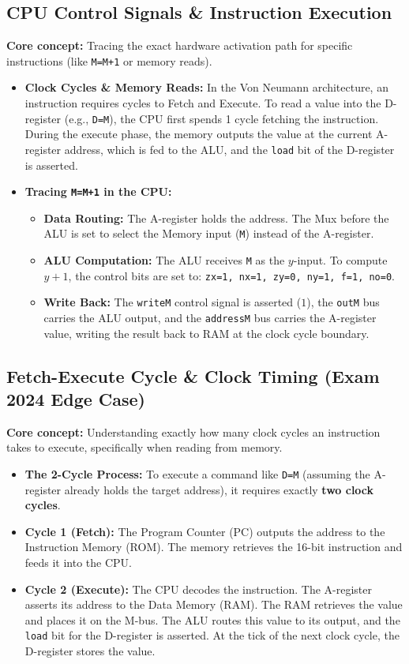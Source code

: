 \documentclass[12pt,a4paper]{article}
\begin{document}
\subsection{CPU Control Signals \& Instruction Execution}
\textbf{Core concept:} Tracing the exact hardware activation path for specific instructions (like \texttt{M=M+1} or memory reads).
\begin{itemize}
    \item \textbf{Clock Cycles \& Memory Reads:} In the Von Neumann architecture, an instruction requires cycles to Fetch and Execute. To read a value into the D-register (e.g., \texttt{D=M}), the CPU first spends 1 cycle fetching the instruction. During the execute phase, the memory outputs the value at the current A-register address, which is fed to the ALU, and the \texttt{load} bit of the D-register is asserted.
    \item \textbf{Tracing \texttt{M=M+1} in the CPU:}
    \begin{itemize}
        \item \textbf{Data Routing:} The A-register holds the address. The Mux before the ALU is set to select the Memory input (\texttt{M}) instead of the A-register.
        \item \textbf{ALU Computation:} The ALU receives \texttt{M} as the $y$-input. To compute $y+1$, the control bits are set to: \texttt{zx=1, nx=1, zy=0, ny=1, f=1, no=0}.
        \item \textbf{Write Back:} The \texttt{writeM} control signal is asserted ($1$), the \texttt{outM} bus carries the ALU output, and the \texttt{addressM} bus carries the A-register value, writing the result back to RAM at the clock cycle boundary.
    \end{itemize}
\end{itemize}

\subsection{Fetch-Execute Cycle \& Clock Timing (Exam 2024 Edge Case)}
\textbf{Core concept:} Understanding exactly how many clock cycles an instruction takes to execute, specifically when reading from memory.
\begin{itemize}
    \item \textbf{The 2-Cycle Process:} To execute a command like \texttt{D=M} (assuming the A-register already holds the target address), it requires exactly \textbf{two clock cycles}.
    \item \textbf{Cycle 1 (Fetch):} The Program Counter (PC) outputs the address to the Instruction Memory (ROM). The memory retrieves the 16-bit instruction and feeds it into the CPU.
    \item \textbf{Cycle 2 (Execute):} The CPU decodes the instruction. The A-register asserts its address to the Data Memory (RAM). The RAM retrieves the value and places it on the M-bus. The ALU routes this value to its output, and the \texttt{load} bit for the D-register is asserted. At the tick of the next clock cycle, the D-register stores the value.
\end{itemize}
\end{document}
